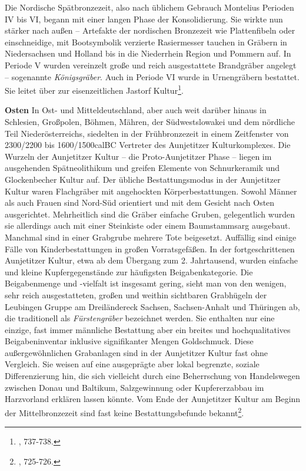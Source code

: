 \documentclass[openany,twoside,twocolumn]{book}
\let\rmarkdownfootnote\footnote%
\def\footnote{\protect\rmarkdownfootnote}
\begin{document}
Die Nordische Spätbronzezeit, also nach üblichem Gebrauch Montelius
Perioden IV bis VI, begann mit einer langen Phase der Konsolidierung.
Sie wirkte nun stärker nach außen -- Artefakte der nordischen Bronzezeit
wie Plattenfibeln oder einschneidige, mit Bootsymbolik verzierte
Rasiermesser tauchen in Gräbern in Niedersachsen und Holland bis in die
Niederrhein Region und Pommern auf. In Periode V wurden vereinzelt große
und reich ausgestattete Brandgräber angelegt -- sogenannte
\emph{Königsgräber}. Auch in Periode VI wurde in Urnengräbern bestattet.
Sie leitet über zur eisenzeitlichen Jastorf Kultur\footnote{\textcite{jockenhovel_germany_2013},
  737-738.}.

\textbf{Osten} \newline  In Ost- und Mitteldeutschland, aber auch weit
darüber hinaus in Schlesien, Großpolen, Böhmen, Mähren, der
Südwestslowakei und dem nördliche Teil Niederösterreichs, siedelten in
der Frühbronzezeit in einem Zeitfenster von 2300/2200 bis 1600/1500calBC
Vertreter des Aunjetitzer Kulturkomplexes. Die Wurzeln der Aunjetitzer
Kultur -- die Proto-Aunjetitzer Phase -- liegen im ausgehenden
Spätneolithikum und greifen Elemente von Schnurkeramik und Glockenbecher
Kultur auf. Der übliche Bestattungsmodus in der Aunjetitzer Kultur waren
Flachgräber mit angehockten Körperbestattungen. Sowohl Männer als auch
Frauen sind Nord-Süd orientiert und mit dem Gesicht nach Osten
ausgerichtet. Mehrheitlich sind die Gräber einfache Gruben, gelegentlich
wurden sie allerdings auch mit einer Steinkiste oder einem Baumstammsarg
ausgebaut. Manchmal sind in einer Grabgrube mehrere Tote beigesetzt.
Auffällig sind einige Fälle von Kinderbestattungen in großen
Vorratsgefäßen. In der fortgeschrittenen Aunjetitzer Kultur, etwa ab dem
Übergang zum 2. Jahrtausend, wurden einfache und kleine
Kupfergegenstände zur häufigsten Beigabenkategorie. Die Beigabenmenge
und -vielfalt ist insgesamt gering, sieht man von den wenigen, sehr
reich ausgestatteten, großen und weithin sichtbaren Grabhügeln der
Leubingen Gruppe am Dreiländereck Sachsen, Sachsen-Anhalt und Thüringen
ab, die traditionell als \emph{Fürstengräber} bezeichnet werden. Sie
enthalten nur eine einzige, fast immer männliche Bestattung aber ein
breites und hochqualitatives Beigabeninventar inklusive signifikanter
Mengen Goldschmuck. Diese außergewöhnlichen Grabanlagen sind in der
Aunjetitzer Kultur fast ohne Vergleich. Sie weisen auf eine ausgeprägte
aber lokal begrenzte, soziale Differenzierung hin, die sich vielleicht
durch eine Beherrschung von Handelswegen zwischen Donau und Baltikum,
Salzgewinnung oder Kupfererzabbau im Harzvorland erklären lassen könnte.
Vom Ende der Aunjetitzer Kultur am Beginn der Mittelbronzezeit sind fast
keine Bestattungsbefunde bekannt\footnote{\textcite{jockenhovel_germany_2013},
  725-726.}.
\end{document}
